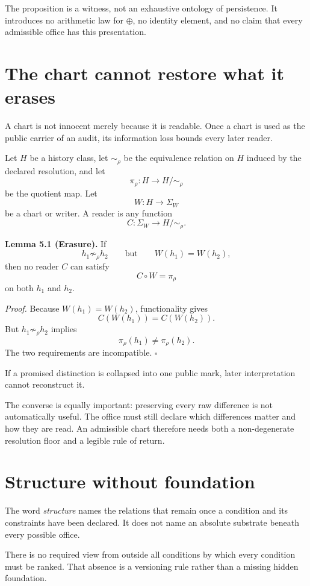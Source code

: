 \documentclass[11pt]{article}
\begin{document}
The proposition is a witness, not an exhaustive ontology of persistence. It introduces no arithmetic law for $\oplus$, no identity element, and no claim that every admissible office has this presentation.

\section{The chart cannot restore what it erases}

A chart is not innocent merely because it is readable. Once a chart is used as the public carrier of an audit, its information loss bounds every later reader.

Let $H$ be a history class, let $\sim_\rho$ be the equivalence relation on $H$ induced by the declared resolution, and let
\[
\pi_\rho:H\to H/{\sim_\rho}
\]
be the quotient map. Let
\[
W:H\to\Sigma_W
\]
be a chart or writer. A reader is any function
\[
C:\Sigma_W\to H/{\sim_\rho}.
\]

\textbf{Lemma 5.1 (Erasure).}
If
\[
h_1\not\sim_\rho h_2
\qquad\text{but}\qquad
W(h_1)=W(h_2),
\]
then no reader $C$ can satisfy
\[
C\circ W=\pi_\rho
\]
on both $h_1$ and $h_2$.

\textit{Proof.}
Because $W(h_1)=W(h_2)$, functionality gives
\[
C(W(h_1))=C(W(h_2)).
\]
But $h_1\not\sim_\rho h_2$ implies
\[
\pi_\rho(h_1)\neq\pi_\rho(h_2).
\]
The two requirements are incompatible. \hfill$\square$

\begin{lawbox}
\centering
If a promised distinction is collapsed into one public mark, later interpretation cannot reconstruct it.
\end{lawbox}

The converse is equally important: preserving every raw difference is not automatically useful. The office must still declare which differences matter and how they are read. An admissible chart therefore needs both a non-degenerate resolution floor and a legible rule of return.

\section{Structure without foundation}

The word \emph{structure} names the relations that remain once a condition and its constraints have been declared. It does not name an absolute substrate beneath every possible office.

There is no required view from outside all conditions by which every condition must be ranked. That absence is a versioning rule rather than a missing hidden foundation.
\end{document}
